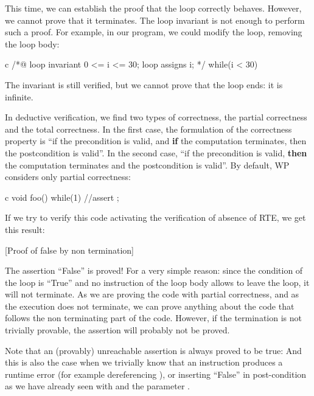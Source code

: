 \documentclass[middle]{zmdocument}
\begin{document}
This time, we can establish the proof that the loop correctly behaves.
However, we cannot prove that it terminates. The loop invariant is not
enough to perform such a proof. For example, in our program, we could
modify the loop, removing the loop body:



\begin{CodeBlock}{c}
/*@
  loop invariant 0 <= i <= 30;
  loop assigns i;
*/
while(i < 30){
   
}
\end{CodeBlock}



The invariant is still verified, but we cannot prove that the loop ends:
it is infinite.





In deductive verification, we find two types of correctness, the partial
correctness and the total correctness. In the first case, the
formulation of the correctness property is ``if the precondition is
valid, and \textbf{if} the computation terminates, then the
postcondition is valid''. In the second case, ``if the precondition is
valid, \textbf{then} the computation terminates and the postcondition is
valid''. By default, WP considers only partial correctness:



\begin{CodeBlock}{c}
void foo(){
  while(1){}
  //assert \false;
}
\end{CodeBlock}



If we try to verify this code activating the verification of absence of
RTE, we get this result:



[Proof of false by non termination]


The assertion ``False'' is proved! For a very simple reason: since the
condition of the loop is ``True'' and no instruction of the loop body
allows to leave the loop, it will not terminate. As we are proving the
code with partial correctness, and as the execution does not terminate,
we can prove anything about the code that follows the non terminating
part of the code. However, if the termination is not trivially provable,
the assertion will probably not be proved.



\begin{Information}
  Note that an (provably) unreachable assertion is always proved to be true:
  And this is also the case when we trivially know that an instruction
  produces a runtime error (for example dereferencing ), or
  inserting ``False'' in post-condition as we have already seen with
   and the parameter .
\end{Information}
\end{document}

